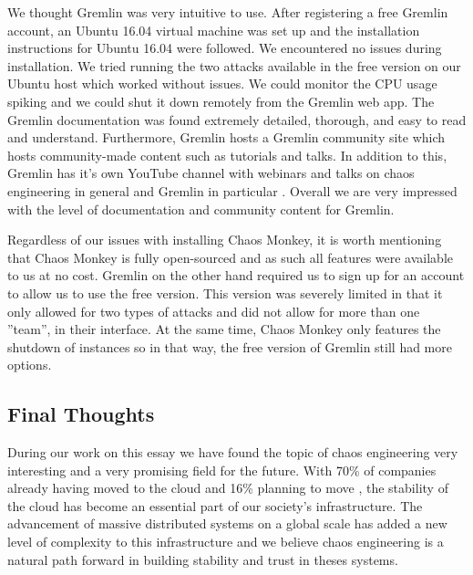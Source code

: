 \documentclass{article}
\begin{document}
We thought Gremlin was very intuitive to use. After registering a free Gremlin account, an Ubuntu 16.04 virtual machine was set up and the installation instructions for Ubuntu 16.04 were followed. We encountered no issues during installation. We tried running the two attacks available in the free version on our Ubuntu host which worked without issues. We could monitor the CPU usage spiking and we could shut it down remotely from the Gremlin web app. The Gremlin documentation was found extremely detailed, thorough, and easy to read and understand. Furthermore, Gremlin hosts a Gremlin community site which hosts community-made content such as tutorials and talks. In addition to this, Gremlin has it's own YouTube channel with webinars and talks on chaos engineering in general and Gremlin in particular \cite{gremlinYouTube}. Overall we are very impressed with the level of documentation and community content for Gremlin.

Regardless of our issues with installing Chaos Monkey, it is worth mentioning that Chaos Monkey is fully open-sourced and as such all features were available to us at no cost. Gremlin on the other hand required us to sign up for an account to allow us to use the free version. This version was severely limited in that it only allowed for two types of attacks and did not allow for more than one ''team'', in their interface. At the same time, Chaos Monkey only features the shutdown of instances so in that way, the free version of Gremlin still had more options.

\subsection{Final Thoughts}
During our work on this essay we have found the topic of chaos engineering very interesting and a very promising field for the future. With 70\% of companies already having moved to the cloud and 16\% planning to move \cite{GremlinPaper}, the stability of the cloud has become an essential part of our society's infrastructure. The advancement of massive distributed systems on a global scale has added a new level of complexity to this infrastructure and we believe chaos engineering is a natural path forward in building stability and trust in theses systems.

\clearpage



\end{document}
